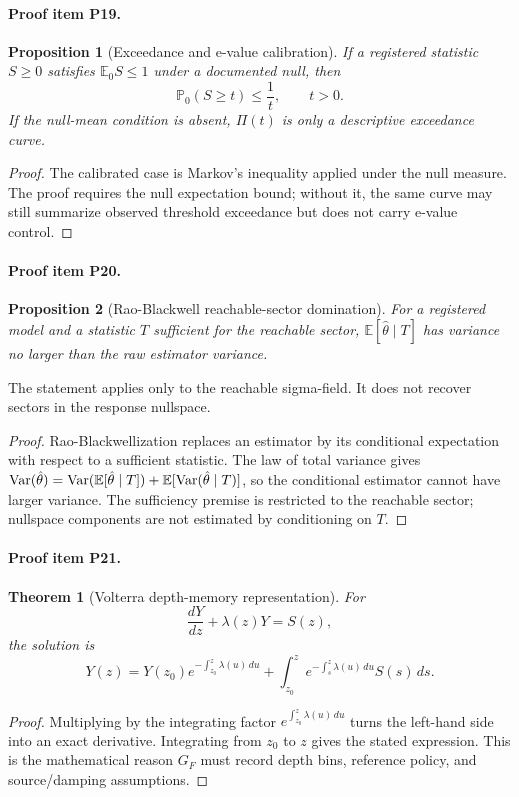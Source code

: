 \documentclass[11pt]{article}
\newcommand{\E}{\mathbb{E}}
\newcommand{\Prob}{\mathbb{P}}
\newcommand{\GF}{G_F}
\newtheorem{proposition}{Proposition}
\newtheorem{theorem}{Theorem}
\begin{document}
\paragraph{Proof item P19.}
\begin{proposition}[Exceedance and e-value calibration]
If a registered statistic \(S\ge0\) satisfies \(\E_0S\le1\) under a documented null, then
\[
  \Prob_0(S\ge t)\le\frac1t,\qquad t>0.
\]
If the null-mean condition is absent, \(\Pi(t)\) is only a descriptive exceedance curve.
\end{proposition}
\begin{proof}
The calibrated case is Markov's inequality applied under the null measure.  The proof requires the null expectation bound; without it, the same curve may still summarize observed threshold exceedance but does not carry e-value control.
\end{proof}

\paragraph{Proof item P20.}
\begin{proposition}[Rao-Blackwell reachable-sector domination]
For a registered model and a statistic \(T\) sufficient for the reachable sector, \(\E[\hat\theta\mid T]\) has variance no larger than the raw estimator variance.
\end{proposition}
The statement applies only to the reachable sigma-field.  It does not recover sectors in the response nullspace.
\begin{proof}
Rao-Blackwellization replaces an estimator by its conditional expectation with respect to a sufficient statistic.  The law of total variance gives \({\rm Var}(\hat\theta)={\rm Var}(\E[\hat\theta\mid T])+\E[{\rm Var}(\hat\theta\mid T)]\), so the conditional estimator cannot have larger variance.  The sufficiency premise is restricted to the reachable sector; nullspace components are not estimated by conditioning on \(T\).
\end{proof}

\paragraph{Proof item P21.}
\begin{theorem}[Volterra depth-memory representation]
For
\[
  \frac{dY}{dz}+\lambda(z)Y=S(z),
\]
the solution is
\[
  Y(z)=Y(z_0)e^{-\int_{z_0}^{z}\lambda(u)\,du}
  +
  \int_{z_0}^{z}e^{-\int_s^z\lambda(u)\,du}S(s)\,ds.
\]
\end{theorem}
\begin{proof}
Multiplying by the integrating factor \(e^{\int_{z_0}^z\lambda(u)\,du}\) turns the left-hand side into an exact derivative.  Integrating from \(z_0\) to \(z\) gives the stated expression.  This is the mathematical reason \(\GF\) must record depth bins, reference policy, and source/damping assumptions.
\end{proof}
\end{document}
